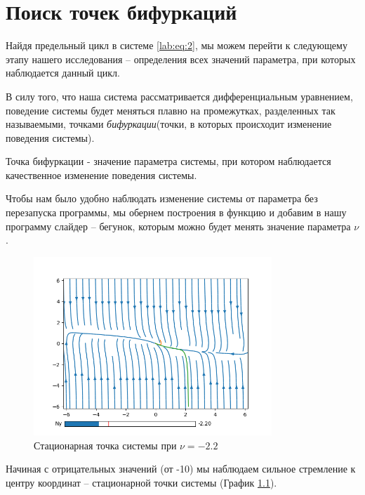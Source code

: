 \chapter{Поиск точек бифуркаций}

Найдя предельный цикл в системе \eqref{lab:eq:2}, мы можем перейти к следующему
этапу нашего исследования -- определения всех значений параметра, при которых
наблюдается данный цикл.

В силу того, что наша система рассматривается дифференциальным уравнением,
поведение системы будет меняться плавно на промежутках, разделенных так
называемыми, точками \textit{бифуркации}(точки, в которых происходит изменение
поведения системы).

\begin{definition}
    Точка бифуркации - значение параметра системы, при котором наблюдается
    качественное изменение поведения системы.
\end{definition}

Чтобы нам было удобно наблюдать изменение системы от параметра без перезапуска
программы, мы обернем построения в функцию и добавим в нашу программу слайдер --
бегунок, которым можно будет менять значение параметра $\nu$.

\begin{figure}
    \centering
    \includegraphics[width=0.8\textwidth]{figures/2_point_-2_2}
    \caption{Стационарная точка системы при $\nu = -2.2$}
    \label{lab2:point_-2}
\end{figure}

Начиная с отрицательных значений (от -10) мы наблюдаем сильное стремление
к центру координат -- стационарной точки системы (График \ref{lab2:point_-2}).

